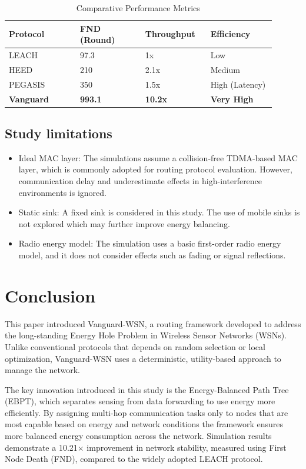 \documentclass[conference]{IEEEtran}
\begin{document}
\begin{table}[htbp]
\caption{Comparative Performance Metrics}
\label{tab2}
\centering
\normalsize
\setlength{\tabcolsep}{4pt}
\begin{tabular}{|p{0.24\linewidth}|p{0.22\linewidth}|p{0.22\linewidth}|p{0.22\linewidth}|}
\hline
\textbf{Protocol} & \textbf{FND (Round)} & \textbf{Throughput} & \textbf{Efficiency} \\
\hline
LEACH & 97.3 & 1x & Low \\
HEED & 210 & 2.1x & Medium \\
PEGASIS & 350 & 1.5x & High (Latency) \\
\textbf{Vanguard} & \textbf{993.1} & \textbf{10.2x} & \textbf{Very High} \\
\hline
\end{tabular}
\end{table}

\subsection{Study limitations}
\begin{itemize}
    \item Ideal MAC layer: The simulations assume a collision-free TDMA-based MAC layer, which is commonly adopted for routing protocol evaluation. However, communication delay and underestimate effects in high-interference environments is ignored.
    \item Static sink: A fixed sink is considered in this study. The use of mobile sinks is not explored which may further improve energy balancing.
    \item Radio energy model: The simulation uses a basic first-order radio energy model, and it does not consider effects such as fading or signal reflections.
\end{itemize}

\section{Conclusion}
This paper introduced Vanguard-WSN, a routing framework developed to address the long-standing Energy Hole Problem in Wireless Sensor Networks (WSNs). Unlike conventional protocols that depends on random selection or local optimization, Vanguard-WSN uses a deterministic, utility-based approach to manage the network.

The key innovation introduced in this study is the Energy-Balanced Path Tree (EBPT), which separates sensing from data forwarding to use energy more efficiently. By assigning multi-hop communication tasks only to nodes that are most capable based on energy and network conditions the framework ensures more balanced energy consumption across the network. Simulation results demonstrate a 10.21$\times$ improvement in network stability, measured using First Node Death (FND), compared to the widely adopted LEACH protocol\cite{b5}.
\end{document}
